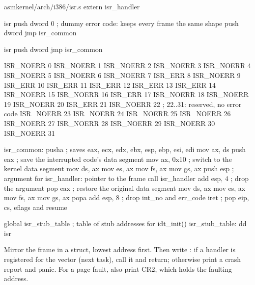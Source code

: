 \documentclass[11pt,a4paper]{article}
\begin{document}
\begin{lst}{asm}{kernel/arch/i386/isr.s}
extern isr_handler

isr%
    push dword 0            ; dummy error code: keeps every frame the same shape
    push dword %
    jmp  isr_common

isr%
    push dword %
    jmp  isr_common

ISR_NOERR 0
ISR_NOERR 1
ISR_NOERR 2
ISR_NOERR 3
ISR_NOERR 4
ISR_NOERR 5
ISR_NOERR 6
ISR_NOERR 7
ISR_ERR   8
ISR_NOERR 9
ISR_ERR   10
ISR_ERR   11
ISR_ERR   12
ISR_ERR   13
ISR_ERR   14
ISR_NOERR 15
ISR_NOERR 16
ISR_ERR   17
ISR_NOERR 18
ISR_NOERR 19
ISR_NOERR 20
ISR_ERR   21
ISR_NOERR 22                ; 22..31: reserved, no error code
ISR_NOERR 23
ISR_NOERR 24
ISR_NOERR 25
ISR_NOERR 26
ISR_NOERR 27
ISR_NOERR 28
ISR_NOERR 29
ISR_NOERR 30
ISR_NOERR 31

isr_common:
    pusha                   ; saves eax, ecx, edx, ebx, esp, ebp, esi, edi
    mov  ax, ds
    push eax                ; save the interrupted code's data segment
    mov  ax, 0x10           ; switch to the kernel data segment
    mov  ds, ax
    mov  es, ax
    mov  fs, ax
    mov  gs, ax
    push esp                ; argument for isr_handler: pointer to the frame
    call isr_handler
    add  esp, 4             ; drop the argument
    pop  eax                ; restore the original data segment
    mov  ds, ax
    mov  es, ax
    mov  fs, ax
    mov  gs, ax
    popa
    add  esp, 8             ; drop int_no and err_code
    iret                    ; pop eip, cs, eflags and resume

global isr_stub_table       ; table of stub addresses for idt_init()
isr_stub_table:
    dd isr%
\end{lst}

Mirror the frame in a struct, lowest address first. Then write : if a handler is registered for the
vector (next task), call it and return; otherwise print a crash report and panic. For a page fault, also print CR2,
which holds the faulting address.
\end{document}
